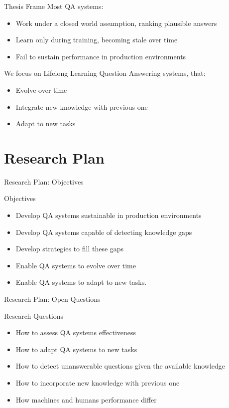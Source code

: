 \documentclass{beamer}
\begin{document}
\begin{frame}{Thesis Frame}
  Most QA systems:
  \begin{itemize}
    \item Work under a closed world assumption, ranking plausible answers
    \item Learn only during training, becoming stale over time
    \item Fail to sustain performance in production environments
  \end{itemize}
  We focus on Lifelong Learning Question Answering systems, that:
  \begin{itemize}
    \item Evolve over time
    \item Integrate new knowledge with previous one
    \item Adapt to new tasks
  \end{itemize}
\end{frame}

\section{Research Plan}
\begin{frame}{Research Plan: Objectives}
  \begin{alertblock}{Objectives}
    \begin{itemize}
      \item Develop QA systems sustainable in production environments
      \item Develop QA systems capable of detecting knowledge gaps
      \item Develop strategies to fill these gaps
      \item Enable QA systems to evolve over time
      \item Enable QA systems to adapt to new tasks.
    \end{itemize}
  \end{alertblock}
\end{frame}


\begin{frame}{Research Plan: Open Questions}
  \begin{alertblock}{Research Questions}
    \begin{itemize}
      \item How to assess QA systems effectiveness
      \item How to adapt QA systems to new tasks
      \item How to detect unanswerable questions given the available knowledge
      \item How to incorporate new knowledge with previous one
      \item How machines and humans performance differ
    \end{itemize}
  \end{alertblock}
\end{frame}
\end{document}
